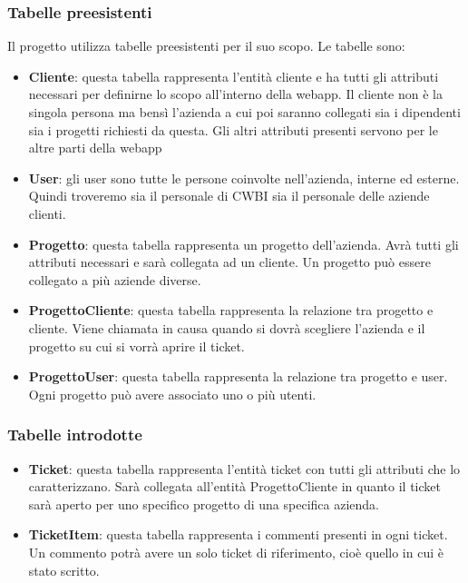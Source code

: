 \subsubsection*{Tabelle preesistenti}
Il progetto utilizza tabelle preesistenti per il suo scopo. Le tabelle sono: 
\begin{itemize}


    \item \textbf{Cliente}: questa tabella rappresenta l'entità cliente e ha tutti gli attributi necessari per definirne lo scopo all'interno della webapp. Il cliente non è la singola persona ma bensì l'azienda a cui poi saranno collegati sia i dipendenti sia i progetti richiesti da questa. Gli altri attributi presenti servono per le altre parti della webapp
    \item \textbf{User}: gli user sono tutte le persone coinvolte nell'azienda, interne ed esterne. Quindi troveremo sia il personale di CWBI sia il personale delle aziende clienti.
    \item \textbf{Progetto}: questa tabella rappresenta un progetto dell'azienda. Avrà tutti gli attributi necessari e sarà collegata ad un cliente. Un progetto può essere collegato a più aziende diverse.
    \item \textbf{ProgettoCliente}: questa tabella rappresenta la relazione tra progetto e cliente. Viene chiamata in causa quando si dovrà scegliere l'azienda e il progetto su cui si vorrà aprire il ticket.
        \item \textbf{ProgettoUser}: questa tabella rappresenta la relazione tra progetto e user. Ogni progetto può avere associato uno o più utenti.
\end{itemize}

\subsubsection*{Tabelle introdotte}
\begin{itemize}
	\item \textbf{Ticket}: questa tabella rappresenta l'entità ticket con tutti gli attributi che lo caratterizzano. Sarà collegata all'entità ProgettoCliente in quanto il ticket sarà aperto per uno specifico progetto di una specifica azienda.
	
	\item \textbf{TicketItem}: questa tabella rappresenta i commenti presenti in ogni ticket. Un commento potrà avere un solo ticket di riferimento, cioè quello in cui è stato scritto.
\end{itemize}


